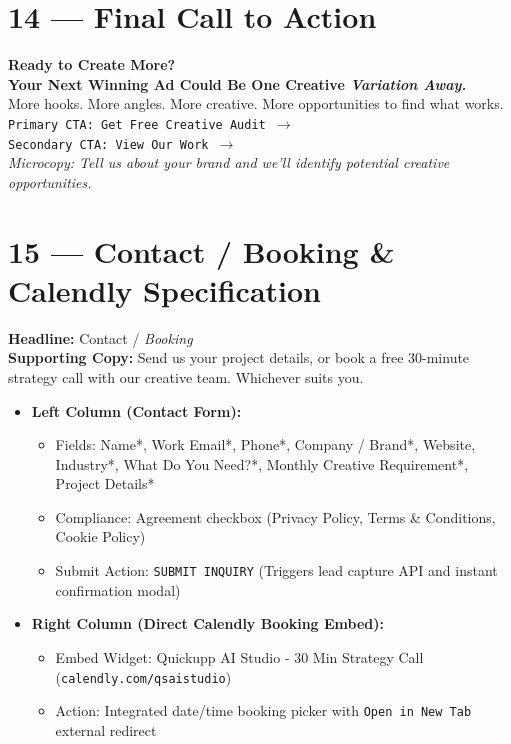 \documentclass[11pt,a4paper]{article}
\begin{document}
\section{14 --- Final Call to Action}
\begin{tcolorbox}[colback=darkslate,coltext=white,colframe=brandpink]
\textbf{Ready to Create More?} \\
\textbf{\Large Your Next Winning Ad Could Be One Creative \textit{Variation Away.}}\\[0.5em]
More hooks. More angles. More creative. More opportunities to find what works.\\[0.5em]
\texttt{Primary CTA: Get Free Creative Audit $\rightarrow$} \\
\texttt{Secondary CTA: View Our Work $\rightarrow$} \\
\textit{Microcopy: Tell us about your brand and we'll identify potential creative opportunities.}
\end{tcolorbox}

\section{15 --- Contact / Booking \& Calendly Specification}
\textbf{Headline:} Contact / \textit{Booking} \\
\textbf{Supporting Copy:} Send us your project details, or book a free 30-minute strategy call with our creative team. Whichever suits you.
\begin{itemize}[noitemsep]
    \item \textbf{Left Column (Contact Form):}
    \begin{itemize}[noitemsep]
        \item Fields: Name*, Work Email*, Phone*, Company / Brand*, Website, Industry*, What Do You Need?*, Monthly Creative Requirement*, Project Details*
        \item Compliance: Agreement checkbox (Privacy Policy, Terms \& Conditions, Cookie Policy)
        \item Submit Action: \texttt{SUBMIT INQUIRY} (Triggers lead capture API and instant confirmation modal)
    \end{itemize}
    \item \textbf{Right Column (Direct Calendly Booking Embed):}
    \begin{itemize}[noitemsep]
        \item Embed Widget: Quickupp AI Studio - 30 Min Strategy Call (\texttt{calendly.com/qsaistudio})
        \item Action: Integrated date/time booking picker with \texttt{Open in New Tab} external redirect
    \end{itemize}
\end{itemize}
\end{document}
